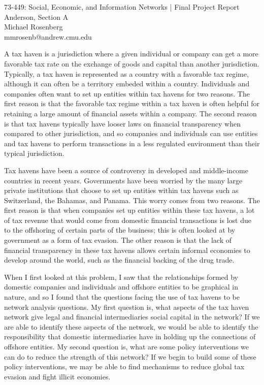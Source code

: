 \documentclass[11pt]{article}
\makeatletter
\newcommand{\myname}{Michael Rosenberg}
\newcommand{\myandrew}{mmrosenb@andrew.cmu.edu}
\newcommand{\mycourse}{73-449: Social, Economic, and Information Networks}
\newcommand{\myhwname}{| Final Project Report}
\newcommand{\myrecitation}{Anderson, Section A}
\newcommand{\myteammates}{}
\makeatother
\begin{document}
\begin{center}
    {\Large \mycourse} {\Large \myhwname} \\
    \myrecitation \\
    \myname \\
    \myandrew \\
\end{center}

A tax haven is a jurisdiction where a given individual or company can get a
more favorable tax rate on the exchange of goods and capital than another
jurisdiction. Typically, a tax haven is represented as a country with a
favorable tax regime, although it can often be a territory embeded within a
country. Individuals and companies often want to set up entities within tax
havens for two reasons. The first reason is that the favorable tax regime within
a tax haven is often helpful for retaining a large amount of financial assets
within a company. The second reason is that tax havens typically have looser
laws on financial transparency when compared to other jurisdiction, and so
companies and individuals can use entities and tax havens to perform
transactions in a less regulated environment than their typical jurisdiction.

Tax havens have been a source of controversy in developed and middle-income
countries in recent years. Governments have been worried by the many large
private institutions that choose to set up entities within tax havens such as
Switzerland, the Bahamas, and Panama. This worry comes from two reasons. The
first reason is that when companies set up entities within these tax havens, a
lot of tax revenue that would come from domestic financial transactions is lost
due to the offshoring of certain parts of the business; this is often looked at
by government as a form of tax evasion. The other reason is that the lack of
financial transparency in these tax havens allows certain informal economies to
develop around the world, such as the financial backing of the drug trade.

When I first looked at this problem, I saw that the relationships formed by
domestic companies and individuals and offshore entities to be graphical in
nature, and so I found that the questions facing the use of tax havens to be
network analysis questions. My first question is, what aspects of the tax haven
network give legal and financial intermediaries social capital in the network?
If we are able to identify these aspects of the network, we would be able to
identify the responsibility that domestic intermediaries have in holding up the
connections of offshore entities. My second question is, what are some policy
interventions we can do to reduce the strength of this network? If we begin to
build some of these policy interventions, we may be able to find mechanisms to
reduce global tax evasion and fight illicit economies.
\end{document}
